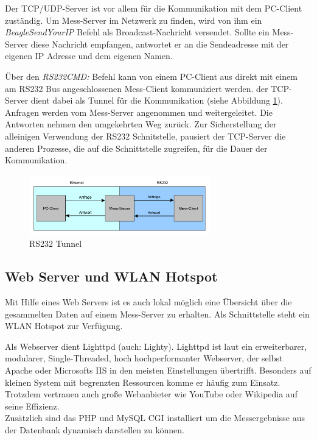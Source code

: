 Der TCP/UDP-Server ist vor allem für die Kommunikation mit dem PC-Client zuständig. Um Mess-Server im Netzwerk zu finden, wird von ihm ein \textit{BeagleSendYourIP} Befehl als Broadcast-Nachricht versendet. Sollte ein Mess-Server diese Nachricht empfangen, antwortet er an die Sendeadresse mit der eigenen IP Adresse und dem eigenen Namen.\ 

Über den \textit{RS232CMD:} Befehl kann von einem PC-Client aus direkt mit einem am RS232 Bus angeschlossenen Mess-Client kommuniziert werden. der TCP-Server dient dabei als Tunnel für die Kommunikation (siehe Abbildung \ref{figure_RS232Tunnel}). Anfragen werden vom Mess-Server angenommen und weitergeleitet. Die Antworten nehmen den umgekehrten Weg zurück. Zur Sicherstellung der alleinigen Verwendung der RS232 Schnitstelle, pausiert der TCP-Server die anderen Prozesse, die auf die Schnittstelle zugreifen, für die Dauer der Kommunikation.\ 


\begin{figure}[H]
\begin{center}
\includegraphics[width=0.7\textwidth ]{img/general/RS232Tunnel.pdf}
\caption{RS232 Tunnel}
\label{figure_RS232Tunnel}
\end{center}
\end{figure}

\newpage
\subsection{Web Server und WLAN Hotspot}
\label{section_WebServerWLANHotspot}

Mit Hilfe eines Web Servers ist es auch lokal möglich eine Übersicht über die gesammelten Daten auf einem Mess-Server zu erhalten. Als Schnittstelle steht ein WLAN Hotspot zur Verfügung.\ 

Als Webserver dient Lighttpd (auch: Lighty). Lighttpd ist laut \cite{bogus2008lighttpd} ein erweiterbarer, modularer, Single-Threaded, hoch hochperformanter Webserver, der selbst Apache oder Microsofts IIS in den meisten Einstellungen übertrifft. Besonders auf kleinen System mit begrenzten Ressourcen komme er häufig zum Einsatz. Trotzdem vertrauen auch große Webanbieter wie YouTube oder Wikipedia auf seine Effizienz.\\
Zusätzlich sind das PHP und MySQL \ac{CGI} installiert um die Messergebnisse aus der Datenbank dynamisch darstellen zu können. 

